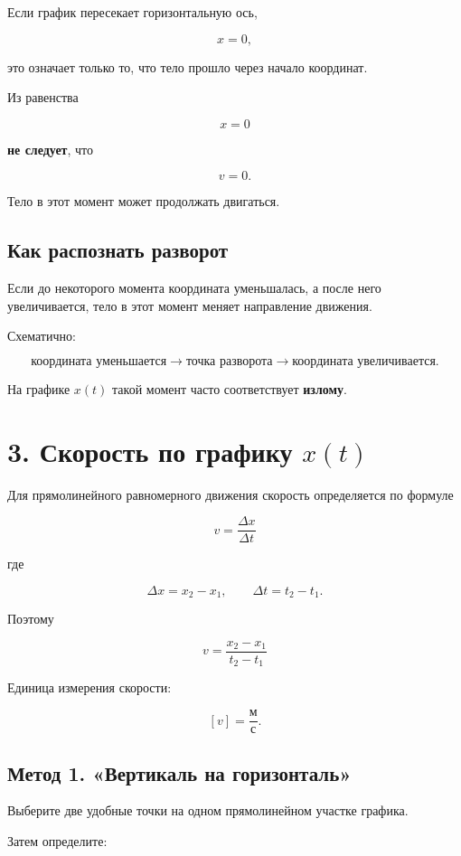 \documentclass[a4paper,12pt]{article}
\newcommand{\key}[1]{\textbf{\color{darkaccent}#1}}
\newcommand{\important}[1]{\textbf{\color{accent}#1}}
\begin{document}
Если график пересекает горизонтальную ось,

\[
x=0,
\]

это означает только то, что тело прошло через начало координат.

Из равенства

\[
x=0
\]

\important{не следует}, что

\[
v=0.
\]

Тело в этот момент может продолжать двигаться.

\subsection{Как распознать разворот}

Если до некоторого момента координата уменьшалась, а после него
увеличивается, тело в этот момент меняет направление движения.

Схематично:

\[
\text{координата уменьшается}
\longrightarrow
\text{точка разворота}
\longrightarrow
\text{координата увеличивается}.
\]

На графике \(x(t)\) такой момент часто соответствует \key{излому}.

\section{3. Скорость по графику \(x(t)\)}

Для прямолинейного равномерного движения скорость определяется по формуле

\[
\boxed{
v=\frac{\Delta x}{\Delta t}
}
\]

где

\[
\Delta x=x_2-x_1,
\qquad
\Delta t=t_2-t_1.
\]

Поэтому

\[
\boxed{
v=\frac{x_2-x_1}{t_2-t_1}
}
\]

Единица измерения скорости:

\[
[v]=\frac{\text{м}}{\text{с}}.
\]

\subsection{Метод 1. «Вертикаль на горизонталь»}

Выберите две удобные точки на одном прямолинейном участке графика.

Затем определите:
\end{document}
